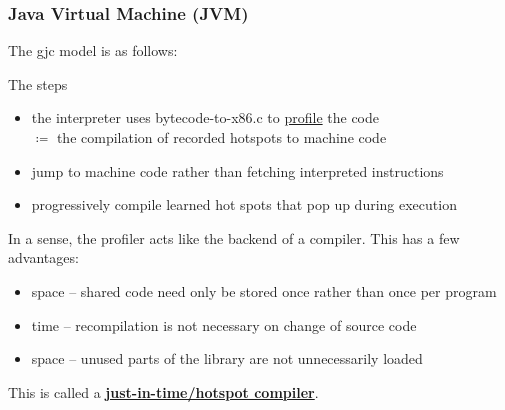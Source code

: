 \documentclass[../../lecture_notes.tex]{subfiles}
\begin{document}
\subsubsection*{Java Virtual Machine (JVM)}
The gjc model is as follows:\\
 \medskip
\noindent The steps \begin{itemize} [itemsep=0mm]
	\item the interpreter uses bytecode-to-x86.c to \underline{profile} the code\\
		$\coloneqq$ the compilation of recorded hotspots to machine code
	\item jump to machine code rather than fetching interpreted instructions
	\item progressively compile learned hot spots that pop up during execution
	\end{itemize}
In a sense, the profiler acts like the backend of a compiler.
This has a few advantages: \begin{itemize} [itemsep=0mm]
	\item space -- shared code need only be stored once rather than once per program
	\item time -- recompilation is not necessary on change of source code
	\item space -- unused parts of the library are not unnecessarily loaded
	\end{itemize}
This is called a \textbf{\underline{just-in-time/hotspot compiler}}.\\
\end{document}
